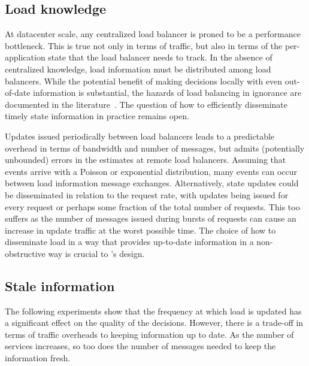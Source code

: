 \subsection{Load knowledge}

At datacenter scale, any centralized load balancer is proned to be a performance
bottleneck. 
%
This is true not only in terms of traffic, but also in terms of the per-application state that the load balancer needs to track. 
%
In the absence of centralized knowledge, load information must
be distributed among load balancers. 
%
While the potential benefit of making decisions locally with even out-of-date information is substantial, the hazards of load balancing in ignorance are
documented in the literature~\cite{dahlin_stale_info,mitzenmacher_old_info}. 
%
The question of how to efficiently disseminate timely state information in
practice remains open.

Updates issued periodically between load balancers leads to a
predictable overhead in terms of bandwidth and number of messages, but
admits (potentially unbounded) errors in the estimates at remote load
balancers. 
%
Assuming that events arrive with a Poisson or exponential
distribution, many events can occur between load information message
exchanges.  
%
Alternatively, state updates could be disseminated in relation to the request rate, with updates being issued for every request or perhaps some fraction of the total number of requests. 
%
This too suffers as the number of messages issued during bursts of requests
can cause an increase in update traffic at the worst possible
time. 
%
The choice of how to disseminate load in a way that provides
up-to-date information in a non-obstructive way is crucial to \daronpon's design.


\subsection{Stale information}

The following experiments show that the frequency at which load is updated has a
significant effect on the quality of the decisions. 
%
However, there is a trade-off in terms of traffic overheads to keeping information up 
to date. 
%
As the number of services increases, so too does the number of messages needed to
keep the information fresh. 

